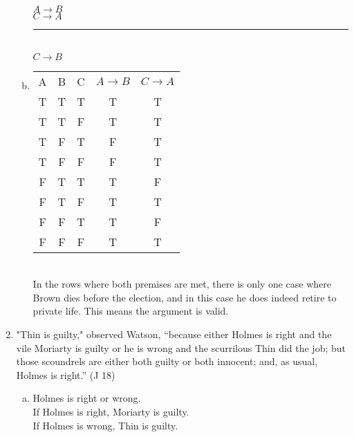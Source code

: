 \documentclass{article}
\begin{document}
\begin{enumerate}
\begin{enumerate}[(a)]
                        $A \to B$\\
                        $C \to A$\\
                        \rule{5em}{.5pt}\\
                        $C \to B$
                  \item
                        \begin{tabular}{c|c|c|c|c}
                              A                      & B & C & $A \to B$ & $C \to A$ \\
                              T                      & T & T & T         & T         \\
                              T                      & T & F & T         & T         \\
                              \rowcolor{lightgray} T & F & T & F         & T         \\
                              \rowcolor{lightgray} T & F & F & F         & T         \\
                              \rowcolor{lightgray} F & T & T & T         & F         \\
                              F                      & T & F & T         & T         \\
                              \rowcolor{lightgray} F & F & T & T         & F         \\
                              F                      & F & F & T         & T         \\
                        \end{tabular} \\ In the rows where both premises are met, there is only one case where Brown dies before the election, and in this case he does indeed retire to private life. This means the argument is valid.
            \end{enumerate}
      \item "Thin is guilty," observed Watson, “because either Holmes is right and the vile Moriarty is guilty or he is wrong and the scurrilous Thin did the job; but those scoundrels are either both guilty or both innocent; and, as usual, Holmes is right.” (J 18)
            \begin{enumerate}[(a)]
                  \item Holmes is right or wrong.\\
                        If Holmes is right, Moriarty is guilty.\\
                        If Holmes is wrong, Thin is guilty.\\

\end{enumerate}
\end{enumerate}
\end{document}
